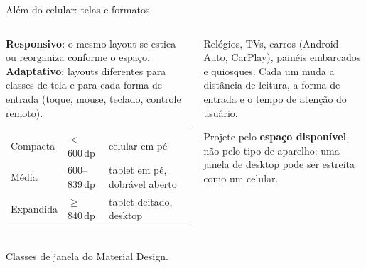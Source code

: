 \begin{frame}{Além do celular: telas e formatos}
  \begin{columns}[T]
    \begin{column}{0.5\textwidth}
      \begin{definicao}
        \textbf{Responsivo}: o mesmo layout se estica ou reorganiza conforme o espaço.
        \textbf{Adaptativo}: layouts diferentes para classes de tela e para cada forma de entrada (toque, mouse, teclado, controle remoto).
      \end{definicao}
      \scriptsize
      \begin{tabularx}{\linewidth}{@{}l l L@{}}
        \toprule
         &  &  \\
        \midrule
        Compacta & $<$ 600\,dp & celular em pé \\
        Média & 600--839\,dp & tablet em pé, dobrável aberto \\
        Expandida & $\geq$ 840\,dp & tablet deitado, desktop \\
        \bottomrule
      \end{tabularx}\\[2pt]
      {\tiny Classes de janela do Material Design.}
    \end{column}
    \begin{column}{0.48\textwidth}
      \begin{conceito}
        Relógios, TVs, carros (Android Auto, CarPlay), painéis embarcados e quiosques. Cada um muda a distância de leitura, a forma de entrada e o tempo de atenção do usuário.
      \end{conceito}
      \begin{dica}
        Projete pelo \textbf{espaço disponível}, não pelo tipo de aparelho: uma janela de desktop pode ser estreita como um celular.
      \end{dica}
    \end{column}
  \end{columns}
\end{frame}
